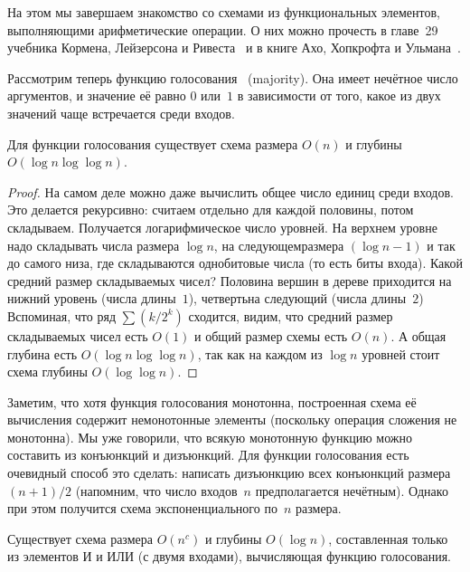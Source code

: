 На этом мы завершаем знакомство со схемами из функциональных
элементов, выполняющими арифметические операции. О них можно
прочесть в главе~29 учебника Кормена,%
Лейзерсона%
и Ривеста~\cite{cormen-leiserson-rivest}%
и в книге Ахо,%
Хопкрофта%
и Ульмана~\cite{aho-hopcroft-ullman}.%

Рассмотрим теперь функцию  голосования%
%
%
\ (majority).%
Она имеет нечётное число аргументов, и значение её равно
$0$ или~$1$ в зависимости от того, какое из двух значений
чаще встречается среди входов.

\begin{theorem}
Для функции голосования существует схема размера $O(n)$ и глубины $O(\log n\log\log n)$.%
\end{theorem}

\begin{proof}
На самом деле можно даже вычислить общее число единиц среди
входов. Это делается рекурсивно: считаем отдельно для каждой
половины, потом складываем. Получается логарифмическое число
уровней. На верхнем уровне надо складывать числа размера $\log
n$, на следующем\т размера ${(\log n -1)}$ и так до самого низа,
где складываются однобитовые числа (то есть биты входа). Какой
средний размер складываемых чисел? Половина вершин в дереве
приходится на нижний уровень (числа длины~$1$), четверть\т на
следующий (числа длины~$2$)  Вспоминая, что ряд $\sum
(k/2^k)$ сходится, видим, что средний размер складываемых чисел
есть $O(1)$ и общий размер схемы есть $O(n)$. А общая глубина
есть $O(\log n \log\log n)$, так как на каждом из $\log n$
уровней стоит схема глубины $O(\log\log n)$.
\end{proof}

Заметим, что хотя функция голосования монотонна,
построенная схема её вычисления
содержит немонотонные элементы (поскольку операция
сложения не монотонна). Мы уже говорили, что всякую монотонную
функцию можно составить из конъюнкций и дизъюнкций. Для функции
голосования есть очевидный способ это сделать: написать
дизъюнкцию всех конъюнкций размера $(n+1)/2$ (напомним, что число
входов~$n$ предполагается нечётным). Однако при этом получится
схема экспоненциального по~$n$ размера.

\begin{theorem}
Существует схема размера $O(n^c)$ и глубины $O(\log n)$,
составленная только из элементов И и ИЛИ (с двумя входами),
вычисляющая функцию голосования.
\end{theorem}

